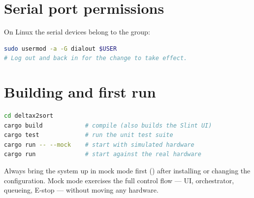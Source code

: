 \section{Serial port permissions}
%
On Linux the serial devices belong to the  group:
\begin{lstlisting}[language=bash]
sudo usermod -a -G dialout $USER
# Log out and back in for the change to take effect.
\end{lstlisting}

\section{Building and first run}
%
\begin{lstlisting}[language=bash]
cd deltax2sort
cargo build            # compile (also builds the Slint UI)
cargo test             # run the unit test suite
cargo run -- --mock    # start with simulated hardware
cargo run              # start against the real hardware
\end{lstlisting}

\begin{tipbox}
  Always bring the system up in mock mode first
  () after installing or changing the
  configuration. Mock mode exercises the full control flow --- UI,
  orchestrator, queueing, E-stop --- without moving any hardware.
\end{tipbox}

